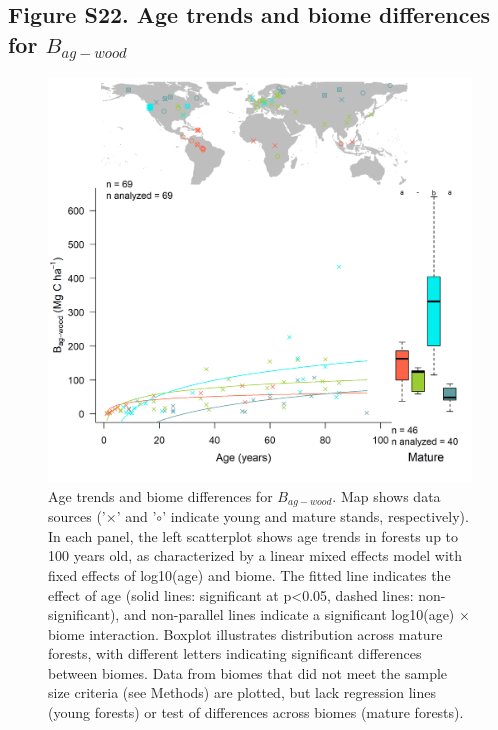 \documentclass[
]{article}
\begin{document}
\newpage

\hypertarget{figure-s22.-age-trends-and-biome-differences-for-b_ag-wood}{%
\subsection{\texorpdfstring{Figure S22. Age trends and biome differences
for
\(B_{ag-wood}\)}{Figure S22. Age trends and biome differences for B\_\{ag-wood\}}}\label{figure-s22.-age-trends-and-biome-differences-for-b_ag-wood}}

\begin{figure}[H]

{\centering \includegraphics[width=1\linewidth]{tables_figures/age_trends/biomass_ag_woody_with_map} 

}

\caption{Age trends and biome differences for $B_{ag-wood}$. Map shows data sources ('$\times$' and '$\circ$' indicate young and mature stands, respectively). In each panel, the left scatterplot shows age trends in forests up to 100 years old, as characterized by a linear mixed effects model with fixed effects of log10(age) and biome. The fitted line indicates the effect of age (solid lines: significant at p<0.05, dashed lines: non-significant), and non-parallel lines indicate a significant log10(age) $\times$ biome interaction. Boxplot illustrates distribution across mature forests, with different letters indicating significant differences between biomes. Data from biomes that did not meet the sample size criteria (see Methods) are plotted, but lack regression lines (young forests) or test of differences across biomes (mature forests).}\label{fig:unnamed-chunk-25}
\end{figure}
\end{document}
